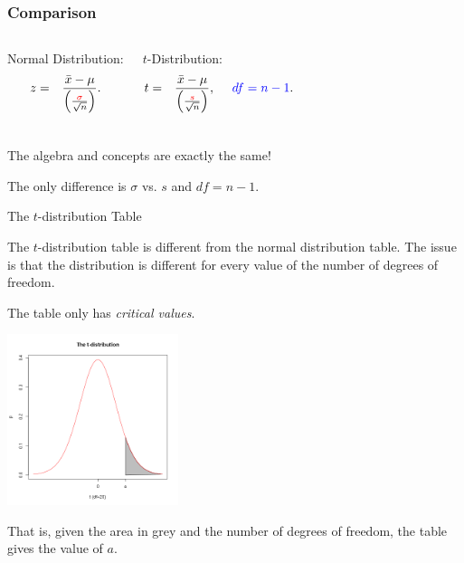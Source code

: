 \begin{frame}
  \frametitle{Comparison}

  \begin{columns}
    Normal Distribution:
    \begin{eqnarray*}
      z &  = & \frac{\bar{x}-\mu}{\left( \frac{{\color{red}\sigma}}{\sqrt{n}} \right)}.
    \end{eqnarray*}

    $t$-Distribution:
    \begin{eqnarray*}
      t &  = & \frac{\bar{x}-\mu}{\left( \frac{{\color{red}s}}{\sqrt{n}} \right)}, ~~~~ {\color{blue}df  =  n-1}.
    \end{eqnarray*}

  \end{columns}

  \vfill

    {

      \begin{center}
        The algebra and concepts are exactly the same!

        The only difference is {\color{red}$\sigma$} vs. {\color{red}$s$} and {\color{blue}$df=n-1$}.
      \end{center}
    }

    \vfill
  

\end{frame}


\begin{frame}{The $t$-distribution Table}

  The $t$-distribution table is different from the normal distribution
  table. The issue is that the distribution is different for every
  value of the number of degrees of freedom.

  \vfill

  {\color{red}The table only has \textit{critical values}.}

  \centerline{\includegraphics[width=5cm]{img/tdistTable}}

  That is, given the area in grey and the number of degrees of
  freedom, the table gives the value of $a$.
  
\end{frame}


